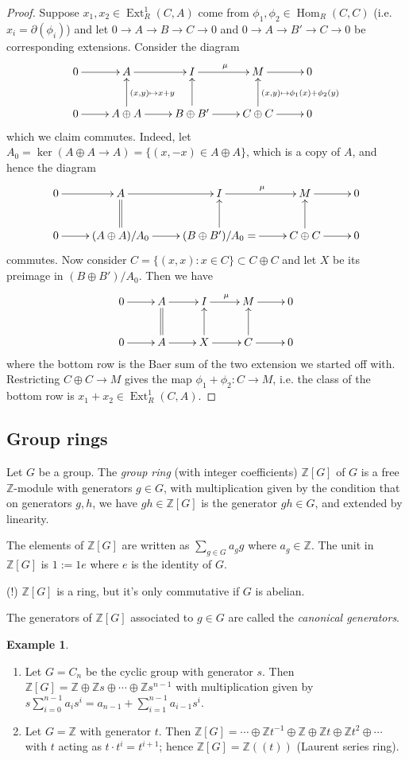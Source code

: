 \documentclass{article}
\newcommand{\Z}{\mathbb{Z}}
\newcommand{\Hom}{\operatorname{Hom}}
\newcommand{\Ext}{\operatorname{Ext}}
\theoremstyle{definition}
\newtheorem{example}[defn]{Example}
\begin{document}
\begin{proof}
Suppose $x_1,x_2\in\Ext_R^1(C,A)$ come from $\phi_1,\phi_2\in\Hom_R(C,C)$ (i.e. $x_i=\partial(\phi_i)$) and let $0\rightarrow A\rightarrow B\rightarrow C\rightarrow 0$ and $0\rightarrow A\rightarrow B'\rightarrow C\rightarrow 0$ be corresponding extensions. Consider the diagram
\[
\xymatrix{
0\ar[r] & A\ar[r] & I\ar[r]^\mu & M\ar[r] & 0 \\
0\ar[r] & A\oplus A \ar[u]_{(x,y)\mapsto x+y} \ar[r] & B\oplus B' \ar[u] \ar[r] & C\oplus C \ar[u]_{(x,y)\mapsto \phi_1(x)+\phi_2(y)} \ar[r] & 0
}
\]
which we claim commutes. Indeed, let $A_0=\ker(A\oplus A\rightarrow A)=\{(x,-x)\in A\oplus A\}$, which is a copy of $A$, and hence the diagram
\[
\xymatrix{
0\ar[r] & A\ar[r] & I\ar[r]^\mu & M\ar[r] & 0 \\
0\ar[r] & (A\oplus A)/A_0 \ar@{=}[u] \ar[r] & (B\oplus B')/A_0= \ar[u] \ar[r] & C\oplus C \ar[u] \ar[r] & 0
}
\]
commutes. Now consider $C=\{(x,x):x\in C\}\subset C\oplus C$ and let $X$ be its preimage in $(B\oplus B')/A_0$. Then we have
\[
\xymatrix{
0\ar[r] & A\ar[r] & I\ar[r]^\mu & M\ar[r] & 0 \\
0\ar[r] & A\ar@{=}[u] \ar[r] & X\ar[r]\ar[u] & C\ar[r]\ar[u] & 0
}
\]
where the bottom row is the Baer sum of the two extension we started off with. Restricting $C\oplus C\rightarrow M$ gives the map $\phi_1+\phi_2:C\rightarrow M$, i.e. the class of the bottom row is $x_1+x_2\in\Ext_R^1(C,A)$.
\end{proof}

\subsection{Group rings}
Let $G$ be a group. The \textit{group ring} (with integer coefficients) $\Z[G]$ of $G$ is a free $\Z$-module with generators $g\in G$, with multiplication given by the condition that on generators $g,h$, we have $gh\in \Z[G]$ is the generator $gh\in G$, and extended by linearity.

The elements of $\Z[G]$ are written as $\sum_{g\in G}a_gg$ where $a_g\in\Z$. The unit in $\Z[G]$ is $1:=1e$ where $e$ is the identity of $G$.

(!) $\Z[G]$ is a ring, but it's only commutative if $G$ is abelian.

The generators of $\Z[G]$ associated to $g\in G$ are called the \textit{canonical generators}.

\begin{example}
\begin{enumerate}
\item Let $G=C_n$ be the cyclic group with generator $s$. Then $\Z[G]=\Z\oplus\Z s\oplus\cdots\oplus\Z s^{n-1}$ with multiplication given by $s\sum_{i=0}^{n-1}a_is^i=a_{n-1}+\sum_{i=1}^{n-1}a_{i-1}s^i$.
\item Let $G=\Z$ with generator $t$. Then $\Z[G]=\cdots\oplus\Z t^{-1}\oplus\Z\oplus\Z t\oplus\Z t^2\oplus\cdots$ with $t$ acting as $t\cdot t^i=t^{i+1}$; hence $\Z[G]=\Z(\!(t)\!)$ (Laurent series ring).
\end{enumerate}
\end{example}
\end{document}

